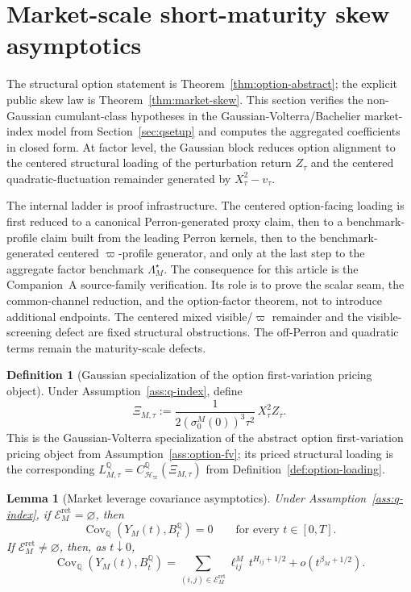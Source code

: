 \documentclass[11pt,a4paper]{amsart}
\theoremstyle{plain}
\newtheorem{lemma}[theorem]{Lemma}
\theoremstyle{definition}
\newtheorem{definition}[theorem]{Definition}
\theoremstyle{remark}
\DeclareMathOperator{\Cov}{Cov}
\newcommand{\QQ}{\mathbb{Q}}
\newcommand{\cH}{\mathcal{H}}
\newcommand{\cE}{\mathcal{E}}
\begin{document}
\section{Market-scale short-maturity skew asymptotics}\label{sec:skew}

The structural option statement is Theorem~\ref{thm:option-abstract}; the explicit public skew law
is Theorem~\ref{thm:market-skew}.  This section verifies the non-Gaussian cumulant-class hypotheses
in the Gaussian-Volterra/Bachelier market-index model from Section~\ref{sec:qsetup} and computes the
aggregated coefficients in closed form.  At factor level, the Gaussian block reduces option
alignment to the centered structural loading of the perturbation return \(Z_\tau\) and the centered
quadratic-fluctuation remainder generated by \(X_\tau^2-v_\tau\).

The internal ladder is proof infrastructure.  The centered option-facing loading is first reduced
to a canonical Perron-generated proxy claim, then to a benchmark-profile claim built from the
leading Perron kernels, then to the benchmark-generated centered \(\varpi\)-profile generator, and
only at the last step to the aggregate factor benchmark \(\Lambda_M^\star\).  The consequence for
this article is the Companion~A source-family verification.  Its role is to prove the scalar seam,
the common-channel reduction, and the option-factor theorem, not to introduce additional endpoints.
The centered mixed visible/\(\varpi\) remainder and the visible-screening defect are fixed
structural obstructions.  The off-Perron and quadratic terms remain the maturity-scale defects.

\begin{definition}[Gaussian specialization of the option first-variation pricing object]\label{def:gaussian-option-object}
Under Assumption~\ref{ass:q-index}, define
\[
        \Xi_{M,\tau}
        :=
        \frac{1}{2(\sigma_0^M(0))^3\tau^2}\,X_\tau^2 Z_\tau.
\]
This is the Gaussian-Volterra specialization of the abstract option first-variation pricing object
from Assumption~\ref{ass:option-fv}; its priced structural loading is the corresponding
\(L_{M,\tau}^\QQ=C_{\cH_\varpi}^\QQ(\Xi_{M,\tau})\) from
Definition~\ref{def:option-loading}.
\end{definition}

\begin{lemma}[Market leverage covariance asymptotics]\label{lem:market-cov}
Under Assumption~\ref{ass:q-index}, if \(\cE_M^{\mathrm{ret}}=\varnothing\), then
\[
        \Cov_\QQ(Y_M(t),B_t^\QQ)=0
        \qquad
        \text{for every }t\in[0,T].
\]
If \(\cE_M^{\mathrm{ret}}\neq\varnothing\), then, as \(t\downarrow0\),
\[
        \Cov_\QQ(Y_M(t),B_t^\QQ)
        =
        \sum_{(i,j)\in\cE_M^{\mathrm{ret}}} \ell_{ij}^M\,t^{H_{ij}+1/2}
        +
        o\!\left(t^{\beta_M+1/2}\right).
\]
\end{lemma}
\end{document}
